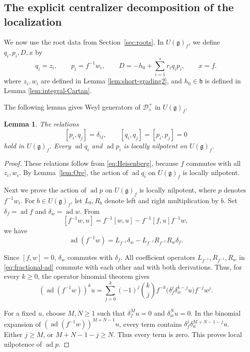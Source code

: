 \documentclass[12pt,a4paper]{amsart}
\numberwithin{equation}{section}
\newtheorem{lemma}[theorem]{Lemma}
\theoremstyle{definition}
\theoremstyle{remark}
\newcommand{\g}{\mathfrak g}
\newcommand{\h}{\mathfrak h}
\newcommand{\D}{\mathcal D}
\newcommand{\ad}{\operatorname{ad}}
\newcommand{\Uf}{U(\g)_f}
\begin{document}
\subsection{The explicit centralizer decomposition of the localization}
\label{ssec:construction}

We now use the root data from Section~\ref{sec:roots}.
In \(\Uf\),  we define \(q_i,p_i,D,x\) by
\begin{equation*}
 q_i=z_i,\qquad p_i=f^{-1}w_i,\qquad
 D=-h_0+\sum_{i=1}^s r_iq_ip_i,\qquad x=f.
\end{equation*}
where
$z_i,w_i$ are defined in Lemma \ref{lem:short-grading2}, and
 $h_0\in \h$ is defined in Lemma \ref{lem:integral-Cartan}.
 
 The following lemma gives Weyl generators of $\D^+_s$ in $\Uf$. 
 
\begin{lemma}\label{lem:fractional-LN}
The relations
\[
 [p_i,q_j]=\delta_{ij},\qquad
 [q_i,q_j]=[p_i,p_j]=0
\]
hold in \(\Uf\). Every \(\ad q_i\) and \(\ad p_i\) is locally nilpotent on $\Uf$.
\end{lemma}

\begin{proof}
These relations follow from \eqref{eq:Heisenberg}, because \(f\)
commutes with all \(z_i,w_i\). By Lemma~\ref{lem:Ore},
the action of \(\ad q_i\) on $\Uf$ is locally nilpotent.

Next we prove the action of $\ad p$ on $\Uf$ is locally nilpotent,  where $p$ denotes \(f^{-1}w_i\).
For \(b\in \Uf\), let \(L_b,R_b\) denote left and right multiplication
by \(b\). Set \(\delta_f=\ad f\) and \(\delta_w=\ad w\).
From
\[
 [f^{-1}w,u]
 =f^{-1}[w,u]-f^{-1}[f,u]f^{-1}w,
\] we have
\begin{equation}\label{eq:fractional-ad}
 \ad(f^{-1}w)
 =
 L_{f^{-1}}\delta_w
 -
 L_{f^{-1}}R_{f^{-1}}R_w\delta_f.
\end{equation}

Since \([f,w]=0\),  $\delta_w$ commutes with $\delta_f$.
All coefficient operators  $L_{f^{-1}}, R_{f^{-1}}, R_w$ in \eqref{eq:fractional-ad} commute with
each other and with both derivations.
Thus, for every \(k\geq0\), the operator binomial theorem gives
\begin{equation}\label{eq:fractional-ad-powers}
 (\ad(f^{-1}w))^k u
 =\sum_{j=0}^{k}(-1)^j\binom kj f^{-k}
   \bigl(\delta_f^j\delta_w^{k-j}u\bigr)f^{-j}w^j.
\end{equation}

For a fixed \(u\), choose \(M,N\geq1\) such that
\(\delta_f^Mu=0\) and \(\delta_w^Nu=0\).
In the binomial expansion of
\((\ad(f^{-1}w))^{M+N-1}u\), every term contains
\(\delta_f^j\delta_w^{M+N-1-j}u\).
Either \(j\geq M\), or \(M+N-1-j\geq N\).
Thus every term is zero. This proves local nilpotence of $\ad p$.
\end{proof}
\end{document}
